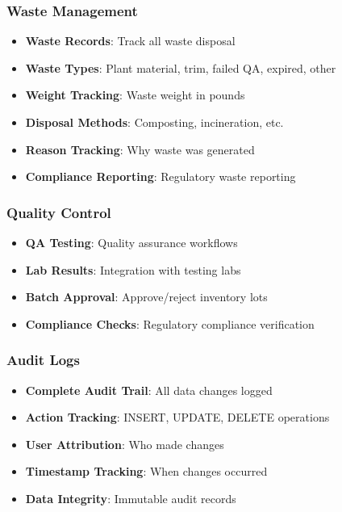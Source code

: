 \documentclass[11pt,a4paper]{article}
\begin{document}
\subsubsection{Waste Management}
\begin{itemize}
    \item \textbf{Waste Records}: Track all waste disposal
    \item \textbf{Waste Types}: Plant material, trim, failed QA, expired, other
    \item \textbf{Weight Tracking}: Waste weight in pounds
    \item \textbf{Disposal Methods}: Composting, incineration, etc.
    \item \textbf{Reason Tracking}: Why waste was generated
    \item \textbf{Compliance Reporting}: Regulatory waste reporting
\end{itemize}

\subsubsection{Quality Control}
\begin{itemize}
    \item \textbf{QA Testing}: Quality assurance workflows
    \item \textbf{Lab Results}: Integration with testing labs
    \item \textbf{Batch Approval}: Approve/reject inventory lots
    \item \textbf{Compliance Checks}: Regulatory compliance verification
\end{itemize}

\subsubsection{Audit Logs}
\begin{itemize}
    \item \textbf{Complete Audit Trail}: All data changes logged
    \item \textbf{Action Tracking}: INSERT, UPDATE, DELETE operations
    \item \textbf{User Attribution}: Who made changes
    \item \textbf{Timestamp Tracking}: When changes occurred
    \item \textbf{Data Integrity}: Immutable audit records
\end{itemize}

\end{document}
